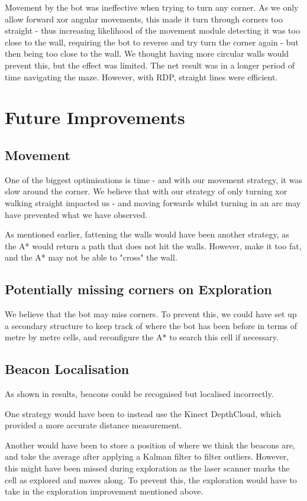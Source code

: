 \documentclass[titlepage,12pt,a4paper]{article}
\begin{document}
Movement by the bot was ineffective when trying to turn any corner. As we only allow forward xor angular movements, this made it turn through corners too straight - thus increasing likelihood of the movement module detecting it was too close to the wall, requiring the bot to reverse and try turn the corner again - but then being too close to the wall. We thought having more circular walls would prevent this, but the effect was limited. The net result was in a longer period of time navigating the maze. However, with RDP, straight lines were efficient.

\pagebreak
\section{Future Improvements}

\subsection*{Movement}
One of the biggest optimisations is time - and with our movement strategy, it was slow around the corner. We believe that with our strategy of only turning xor walking straight impacted us - and moving forwards whilst turning in an arc may have prevented what we have observed. 

As mentioned earlier, fattening the walls would have been another strategy, as the A* would return a path that does not hit the walls. However, make it too fat, and the A* may not be able to "cross" the wall.

\subsection*{Potentially missing corners on Exploration} 
We believe that the bot may miss corners. To prevent this, we could have set up a secondary structure to keep track of where the bot has been before in terms of metre by metre cells, and reconfigure the A* to search this cell if necessary. 

\subsection*{Beacon Localisation}
As shown in results, beacons could be recognised but localised incorrectly.

One strategy would have been to instead use the Kinect DepthCloud, which provided a more accurate distance measurement. 

Another would have been to store a position of where we think the beacons are, and take the average after applying a Kalman filter to filter outliers. However, this might have been missed during exploration as the laser scanner marks the cell as explored and moves along. To prevent this, the exploration would have to take in the exploration improvement mentioned above.
\end{document}
